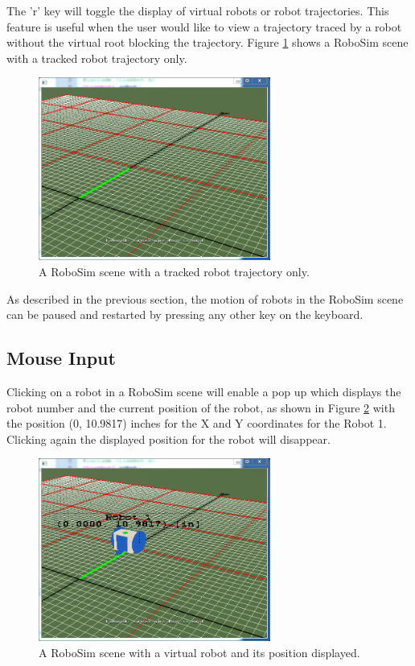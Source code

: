 \documentclass{article}
\begin{document}
The 'r' key will toggle the display of virtual robots or robot trajectories.
This feature is useful when the user would like to view a trajectory traced by a
robot without the virtual root blocking the trajectory.  Figure
\ref{fig:robosim_norobot} shows a RoboSim scene with a tracked robot trajectory
only.
\begin{figure}[H]
	\begin{center}
		\includegraphics[width=3in]{images/robosim_norobot}
	\end{center}
	\caption{A RoboSim scene with a tracked robot trajectory only.}
	\label{fig:robosim_norobot}
\end{figure}

As described in the previous section, the motion of robots in the RoboSim scene
can be paused and restarted by pressing any other key on the keyboard.

\subsection{Mouse Input}
Clicking on a robot in a RoboSim scene will enable a pop up which displays the
robot number and the current position of the robot, as shown in Figure
\ref{fig:robosim_pos} with the position (0, 10.9817) inches for the X and Y
coordinates for the Robot 1.  Clicking again the displayed position for the
robot will disappear.
\begin{figure}[H]
	\begin{center}
		\includegraphics[width=3in]{images/robosim_pos}
	\end{center}
	\caption{A RoboSim scene with a virtual robot and its position displayed.}
	\label{fig:robosim_pos}
\end{figure}
\end{document}
